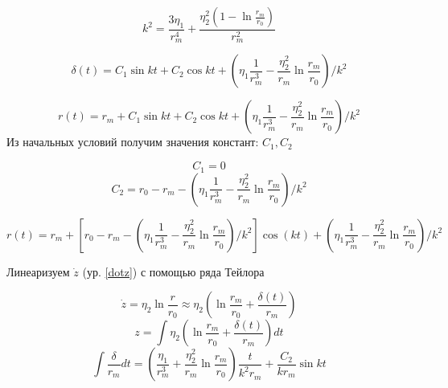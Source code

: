 \begin{equation}
    k^2 = \frac{3\eta_1}{r_m^4} + \frac{\eta_2^2 (1 - \ln{\frac{r_m}{r_0}})}{r_m^2}
\end{equation}

\begin{equation}
    \delta(t) = C_1 \sin{kt} + C_2 \cos{kt} + \left( \eta_1 \frac{1}{r_m^3} - \frac{\eta_2^2}{r_m}\ln{\frac{r_m}{r_0}}    \right)/k^2 
\end{equation}

\begin{equation}
    r(t) = r_m +   C_1 \sin{kt} + C_2 \cos{kt} + \left( \eta_1 \frac{1}{r_m^3} - \frac{\eta_2^2}{r_m}\ln{\frac{r_m}{r_0}}    \right)/k^2   
\end{equation}
Из начальных условий получим значения констант: \(C_1, C_2\)

\begin{equation}
    C_1 = 0    
\end{equation}
\begin{equation}
    C_2 = r_0 - r_m - \left( \eta_1 \frac{1}{r_m^3} - \frac{\eta_2^2}{r_m}\ln{\frac{r_m}{r_0}}    \right)/k^2       
\end{equation}

\begin{equation}
    r(t) = r_m + \left[ r_0 - r_m - \left( \eta_1 \frac{1}{r_m^3} - \frac{\eta_2^2}{r_m}\ln{\frac{r_m}{r_0}}    \right)/k^2    \right] \cos(kt) +    \left( \eta_1 \frac{1}{r_m^3} - \frac{\eta_2^2}{r_m}\ln{\frac{r_m}{r_0}}    \right)/k^2   
\end{equation}

Линеаризуем $\dot{z}$ (ур. \eqref{dotz}) с помощью ряда Тейлора


\begin{equation}
    \dot{z} = \eta_2 \ln{\frac{r}{r_0}} \approx \eta_2 \left(\ln{\frac{r_m}{r_0}} + \frac{\delta(t)}{r_m}  \right)
\end{equation}
\begin{equation}
    z = \int{\eta_2 \left( \ln{\frac{r_m}{r_0}} + \frac{\delta(t)}{r_m}\right)} dt    
\end{equation}
\begin{equation}
    \int{\frac{\delta}{r_m}}dt = \left( \frac{\eta_1}{r_m^3} + \frac{\eta_2^2}{r_m} \ln{\frac{r_m}{r_0}} \right) \frac{t}{k^2 r_m} + \frac{C_2}{k r_m} \sin{kt}    
\end{equation}

